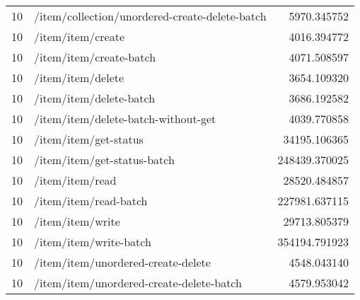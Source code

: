 \begin{longtable}{rlr}
10 & /item/collection/unordered-create-delete-batch & 5970.345752 \\
10 & /item/item/create & 4016.394772 \\
10 & /item/item/create-batch & 4071.508597 \\
10 & /item/item/delete & 3654.109320 \\
10 & /item/item/delete-batch & 3686.192582 \\
10 & /item/item/delete-batch-without-get & 4039.770858 \\
10 & /item/item/get-status & 34195.106365 \\
10 & /item/item/get-status-batch & 248439.370025 \\
10 & /item/item/read & 28520.484857 \\
10 & /item/item/read-batch & 227981.637115 \\
10 & /item/item/write & 29713.805379 \\
10 & /item/item/write-batch & 354194.791923 \\
10 & /item/item/unordered-create-delete & 4548.043140 \\
10 & /item/item/unordered-create-delete-batch & 4579.953042 \\
\end{longtable}
